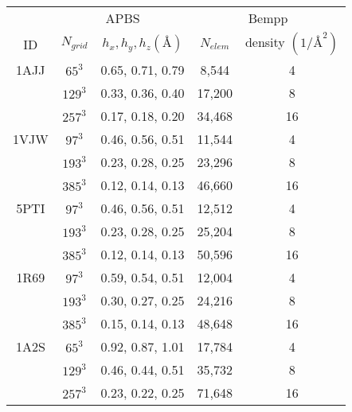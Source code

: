 \documentclass[11pt]{article}
\begin{document}
\begin{table}[]
  \centering
  \begin{tabular}{c|cc|cc}
       & \multicolumn{2}{c|}{APBS}                     & \multicolumn{2}{c}{Bempp}                   \\
  ID   & $N_{grid}$ & $h_x, h_y, h_z (\si{\angstrom})$ & $N_{elem}$ & density $(1/\si{\angstrom}^2)$ \\ \hline
  1AJJ & $65^3$     & 0.65, 0.71, 0.79                 & 8,544      & 4                              \\
       & $129^3$    & 0.33, 0.36, 0.40                 & 17,200     & 8                              \\
       & $257^3$    & 0.17, 0.18, 0.20                 & 34,468     & 16                             \\ \hline
  1VJW & $97^3$     & 0.46, 0.56, 0.51                 & 11,544     & 4                              \\
       & $193^3$    & 0.23, 0.28, 0.25                 & 23,296     & 8                              \\
       & $385^3$    & 0.12, 0.14, 0.13                 & 46,660     & 16                             \\ \hline
  5PTI & $97^3$     & 0.46, 0.56, 0.51                 & 12,512     & 4                              \\
       & $193^3$    & 0.23, 0.28, 0.25                 & 25,204     & 8                              \\
       & $385^3$    & 0.12, 0.14, 0.13                 & 50,596     & 16                             \\ \hline
  1R69 & $97^3$     & 0.59, 0.54, 0.51                 & 12,004     & 4                              \\
       & $193^3$    & 0.30, 0.27, 0.25                 & 24,216     & 8                              \\
       & $385^3$    & 0.15, 0.14, 0.13                 & 48,648     & 16                             \\ \hline
  1A2S & $65^3$     & 0.92, 0.87, 1.01                 & 17,784     & 4                              \\
       & $129^3$    & 0.46, 0.44, 0.51                 & 35,732     & 8                              \\
       & $257^3$    & 0.23, 0.22, 0.25                 & 71,648     & 16                             \\ \hline

\end{tabular}
\end{table}
\end{document}
